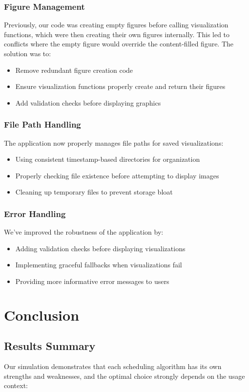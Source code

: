 \documentclass[12pt,a4paper]{article}
\begin{document}
\subsubsection{Figure Management}
Previously, our code was creating empty figures before calling visualization functions, which were then creating their own figures internally. This led to conflicts where the empty figure would override the content-filled figure. The solution was to:
\begin{itemize}
    \item Remove redundant figure creation code
    \item Ensure visualization functions properly create and return their figures
    \item Add validation checks before displaying graphics
\end{itemize}

\subsubsection{File Path Handling}
The application now properly manages file paths for saved visualizations:
\begin{itemize}
    \item Using consistent timestamp-based directories for organization
    \item Properly checking file existence before attempting to display images
    \item Cleaning up temporary files to prevent storage bloat
\end{itemize}

\subsubsection{Error Handling}
We've improved the robustness of the application by:
\begin{itemize}
    \item Adding validation checks before displaying visualizations
    \item Implementing graceful fallbacks when visualizations fail
    \item Providing more informative error messages to users
\end{itemize}

\section{Conclusion}
\subsection{Results Summary}
Our simulation demonstrates that each scheduling algorithm has its own strengths and weaknesses, and the optimal choice strongly depends on the usage context:
\end{document}
